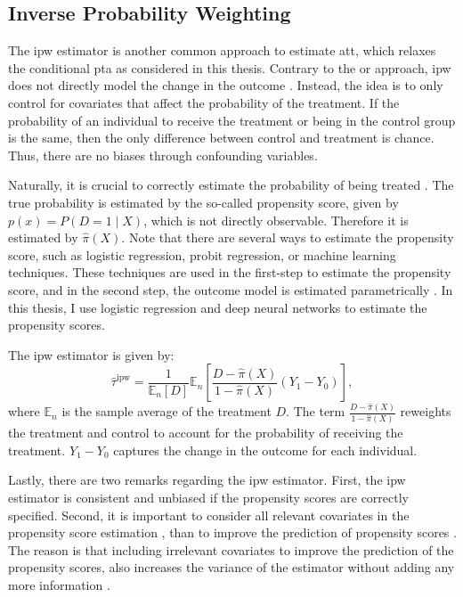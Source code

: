 \subsection{Inverse Probability Weighting}
The \ac{ipw} estimator is another common approach to estimate \ac{att}, which relaxes the conditional \ac{pta} as considered in this thesis.
Contrary to the \ac{or} approach, \ac{ipw} does not directly model the change in the outcome \citep{santannaDoublyRobustDifferenceindifferences2020}.
Instead, the idea is to only control for covariates that affect the probability of the treatment.
If the probability of an individual to receive the treatment or being in the control group is the same, then the only difference between control and treatment is chance.
Thus, there are no biases through confounding variables.

Naturally, it is crucial to correctly estimate the probability of being treated \citep{angrist2009mostly}.
The true probability is estimated by the so-called propensity score, given by $p(x) = P(D=1 \mid X)$, which is not directly observable.
Therefore it is estimated by $\hat{\pi}(X)$.
Note that there are several ways to estimate the propensity score, such as logistic regression, probit regression, or machine learning techniques.
These techniques are used in the first-step to estimate the propensity score, and in the second step, the outcome model is estimated parametrically \citep{abadieSemiparametricDifferenceinDifferencesEstimators2005}.
In this thesis, I use logistic regression and deep neural networks to estimate the propensity scores.

The \ac{ipw} estimator is given by:
\begin{equation}
\hat{\tau}^{\text{ipw}} = \frac{1}{\mathbb{E}_n[D]} \mathbb{E}_n \left[ \frac{D - \hat{\pi}(X)}{1 - \hat{\pi}(X)} (Y_1 - Y_0) \right],
\label{eq:4}
\end{equation}
where $\mathbb{E}_n$  is the sample average of the treatment $D$.
The term $\frac{D - \hat{\pi}(X)}{1 - \hat{\pi}(X)}$ reweights the treatment and control to account for the probability of receiving the treatment.
$Y_1 - Y_0$ captures the change in the outcome for each individual.


Lastly, there are two remarks regarding the \ac{ipw} estimator.
First, the \ac{ipw} estimator is consistent and unbiased if the propensity scores are correctly specified.
Second, it is important to consider all relevant covariates in the propensity score estimation \citep{angrist2009mostly}, than to improve the prediction of propensity scores \citep{https://doi.org/10.3982/ECTA18515}.
The reason is that including irrelevant covariates to improve the prediction of the propensity scores, also increases the variance of the estimator without adding any more information \citep{hernanCausalInferenceWhat}.

